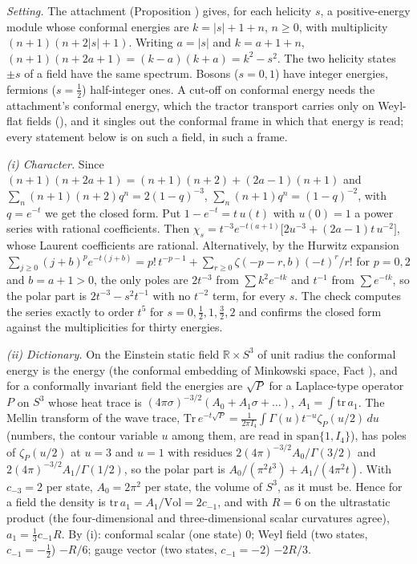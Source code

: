 \emph{Setting.} The attachment (Proposition ) gives, for each helicity $s$, a positive-energy module whose conformal energies are $k = |s| + 1 + n$, $n \ge 0$, with multiplicity $(n+1)(n+2|s|+1)$. Writing $a = |s|$ and $k = a + 1 + n$, $(n+1)(n+2a+1) = (k - a)(k + a) = k^{2} - s^{2}$. The two helicity states $\pm s$ of a field have the same spectrum. Bosons ($s = 0, 1$) have integer energies, fermions ($s = \tfrac12$) half-integer ones. A cut-off on conformal energy needs the attachment's conformal energy, which the tractor transport carries only on Weyl-flat fields (), and it singles out the conformal frame in which that energy is read; every statement below is on such a field, in such a frame.

\emph{(i) Character.} Since $(n+1)(n+2a+1) = (n+1)(n+2) + (2a-1)(n+1)$ and $\sum_{n}(n+1)(n+2)q^{n} = 2(1-q)^{-3}$, $\sum_{n}(n+1)q^{n} = (1-q)^{-2}$, with $q = e^{-t}$ we get the closed form. Put $1 - e^{-t} = t\,u(t)$ with $u(0) = 1$ a power series with rational coefficients. Then $\chi_{s} = t^{-3}e^{-t(a+1)}\bigl[2u^{-3} + (2a-1)t\,u^{-2}\bigr]$, whose Laurent coefficients are rational. Alternatively, by the Hurwitz expansion $\sum_{j \ge 0}(j + b)^{p}e^{-t(j+b)} = p!\,t^{-p-1} + \sum_{r \ge 0}\zeta(-p-r, b)(-t)^{r}/r!$ for $p = 0, 2$ and $b = a + 1 > 0$, the only poles are $2t^{-3}$ from $\sum k^{2}e^{-tk}$ and $t^{-1}$ from $\sum e^{-tk}$, so the polar part is $2t^{-3} - s^{2}t^{-1}$ with no $t^{-2}$ term, for every $s$. The check computes the series exactly to order $t^{5}$ for $s = 0, \tfrac12, 1, \tfrac32, 2$ and confirms the closed form against the multiplicities for thirty energies.

\emph{(ii) Dictionary.} On the Einstein static field $\mathbb{R} \times S^{3}$ of unit radius the conformal energy is the energy (the conformal embedding of Minkowski space, Fact ), and for a conformally invariant field the energies are $\sqrt{P}$ for a Laplace-type operator $P$ on $S^{3}$ whose heat trace is $(4\pi\sigma)^{-3/2}(A_{0} + A_{1}\sigma + \dots)$, $A_{1} = \int\mathrm{tr}\,a_{1}$. The Mellin transform of the wave trace, $\mathrm{Tr}\,e^{-t\sqrt{P}} = \frac{1}{2\pi I_{4}}\int\Gamma(u)t^{-u}\zeta_{P}(u/2)\,du$ (numbers, the contour variable $u$ among them, are read in $\mathrm{span}\{1, I_{4}\}$), has poles of $\zeta_{P}(u/2)$ at $u = 3$ and $u = 1$ with residues $2(4\pi)^{-3/2}A_{0}/\Gamma(3/2)$ and $2(4\pi)^{-3/2}A_{1}/\Gamma(1/2)$, so the polar part is $A_{0}/(\pi^{2}t^{3}) + A_{1}/(4\pi^{2}t)$. With $c_{-3} = 2$ per state, $A_{0} = 2\pi^{2}$ per state, the volume of $S^{3}$, as it must be. Hence for a field the density is $\mathrm{tr}\,a_{1} = A_{1}/\mathrm{Vol} = 2c_{-1}$, and with $R = 6$ on the ultrastatic product (the four-dimensional and three-dimensional scalar curvatures agree), $a_{1} = \tfrac13 c_{-1}R$. By (i): conformal scalar (one state) $0$; Weyl field (two states, $c_{-1} = -\tfrac12$) $-R/6$; gauge vector (two states, $c_{-1} = -2$) $-2R/3$.

